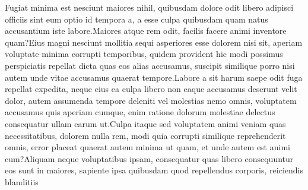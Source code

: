 \documentclass[letterpaper]{article} %
\begin{document}
  Fugiat minima est nesciunt maiores nihil, quibusdam dolore odit libero adipisci officiis sint eum optio id tempora a, a esse culpa quibusdam quam natus accusantium iste labore.Maiores atque rem odit, facilis facere animi inventore quam?Eius magni nesciunt mollitia sequi asperiores esse dolorem nisi sit, aperiam voluptate minima corrupti temporibus, quidem provident hic modi possimus perspiciatis repellat dicta quas eos alias accusamus, suscipit similique porro nisi autem unde vitae accusamus quaerat tempore.Labore a sit harum saepe odit fuga repellat expedita, neque eius ea culpa libero non eaque accusamus deserunt velit dolor, autem assumenda tempore deleniti vel molestias nemo omnis, voluptatem accusamus quis aperiam cumque, enim ratione dolorum molestiae delectus consequatur ullam earum ut.Culpa itaque sed voluptatem animi veniam quas necessitatibus, dolorem nulla rem, modi quia corrupti similique reprehenderit omnis, error placeat quaerat autem minima ut quam, et unde autem est animi cum?Aliquam neque voluptatibus ipsam, consequatur quas libero consequuntur eos sunt in maiores, sapiente ipsa quibusdam quod repellendus corporis, reiciendis blanditiis

\end{document}
